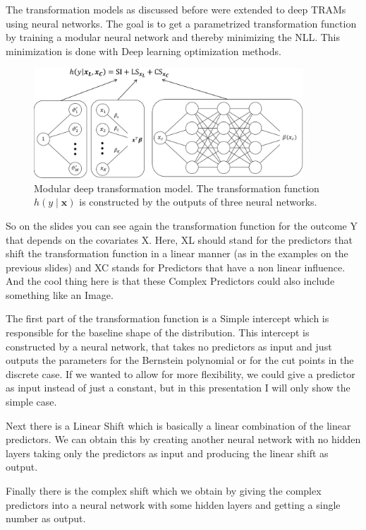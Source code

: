 The transformation models as discussed before were extended to deep TRAMs using neural networks. The goal is to get a parametrized transformation function by training a modular neural network and thereby minimizing the NLL. This minimization is done with Deep learning optimization methods.

\begin{figure}[H]
\centering
\includegraphics[width=0.9\textwidth]{img/deep_tram.png}
\caption{Modular deep transformation model. The transformation function $h(y \mid \mathbf{x})$ is constructed by the outputs of three neural networks.}
\label{fig:deep_tram}
\end{figure}

So on the slides you can see again the transformation function for the outcome Y that depends on the covariates X. Here, XL should stand for the predictors that shift the transformation function in a linear manner (as in the examples on the previous slides) and XC stands for Predictors that have a non linear influence. And the cool thing here is that these Complex Predictors could also include something like an Image.

The first part of the transformation function is a Simple intercept which is responsible for the baseline shape of the distribution. This intercept is constructed by a neural network, that takes no predictors as input and just outputs the parameters for the Bernstein polynomial or for the cut points in the discrete case. If we wanted to allow for more flexibility, we could give a predictor as input instead of just a constant, but in this presentation I will only show the simple case.

Next there is a Linear Shift which is basically a linear combination of the linear predictors. We can obtain this by creating another neural network with no hidden layers taking only the predictors as input and producing the linear shift as output.

Finally there is the complex shift which we obtain by giving the complex predictors into a neural network with some hidden layers and getting a single number as output.


